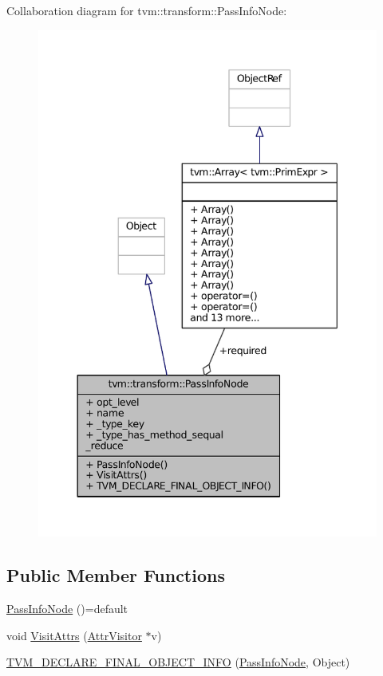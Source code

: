 Collaboration diagram for tvm\+:\+:transform\+:\+:Pass\+Info\+Node\+:
\nopagebreak
\begin{figure}[H]
\begin{center}
\leavevmode
\includegraphics[width=343pt]{classtvm_1_1transform_1_1PassInfoNode__coll__graph}
\end{center}
\end{figure}
\subsection*{Public Member Functions}
\begin{DoxyCompactItemize}
\item 
\hyperlink{classtvm_1_1transform_1_1PassInfoNode_a2b9533e2f517d5c1a5e6bb1eb703d8aa}{Pass\+Info\+Node} ()=default
\item 
void \hyperlink{classtvm_1_1transform_1_1PassInfoNode_a09fd26c53f74228763943f519c7d3277}{Visit\+Attrs} (\hyperlink{classtvm_1_1AttrVisitor}{Attr\+Visitor} $\ast$v)
\item 
\hyperlink{classtvm_1_1transform_1_1PassInfoNode_a96b397a026358e744938176dc91c71d0}{T\+V\+M\+\_\+\+D\+E\+C\+L\+A\+R\+E\+\_\+\+F\+I\+N\+A\+L\+\_\+\+O\+B\+J\+E\+C\+T\+\_\+\+I\+N\+FO} (\hyperlink{classtvm_1_1transform_1_1PassInfoNode}{Pass\+Info\+Node}, Object)
\end{DoxyCompactItemize}
